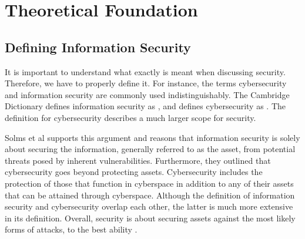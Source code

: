 \section{Theoretical Foundation}

\subsection{Defining Information Security}
It is important to understand what exactly is meant when discussing security. Therefore, we have to properly define it. For instance, the terms cybersecurity and information security are commonly used indistinguishably. The Cambridge Dictionary defines information security as , and defines cybersecurity as . The definition for cybersecurity describes a much larger scope for security. 

Solms et al \cite{von_Solms_2013} supports this argument and reasons that information security is solely about securing the information, generally referred to as the asset, from potential threats posed by inherent vulnerabilities. Furthermore, they outlined that cybersecurity goes beyond protecting assets. Cybersecurity includes the protection of those that function in cyberspace in addition to any of their assets that can be attained through cyberspace. Although the definition of information security and cybersecurity overlap each other, the latter is much more extensive in its definition. Overall, security is about securing assets against the most likely forms of attacks, to the best ability \cite{andress2014the}.



